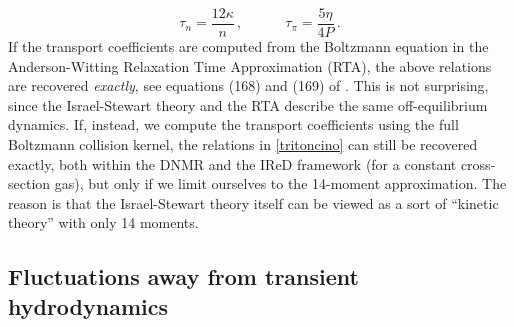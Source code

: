 \documentclass[aps,prd,preprint,nofootinbib,amsmath,amssymb,showpacs,longbibliography,singlecolumn,superscriptaddress,10pt]{revtex4-1}
\theoremstyle{plain}
\theoremstyle{definition}
\begin{document}
\begin{equation}\label{tritoncino}
    \tau_n = \dfrac{12 \kappa}{n} \, , \quad \quad \quad \tau_\pi = \dfrac{5\eta}{4P} \, .
\end{equation}
If the transport coefficients are computed from the Boltzmann equation in the Anderson-Witting Relaxation Time Approximation (RTA), the above relations are recovered \textit{exactly}, see equations (168) and (169) of \cite{Ambrus:2022vif}. This is not surprising, since the Israel-Stewart theory and the RTA describe the same off-equilibrium dynamics. If, instead, we compute the transport coefficients using the full Boltzmann collision kernel, the relations in \eqref{tritoncino} can still be recovered exactly, both within the DNMR \cite{Denicol:2012cn} and the IReD \cite{Wagner:2022ayd} framework (for a constant cross-section gas), but only if we limit ourselves to the 14-moment approximation. The reason is that the Israel-Stewart theory itself can be viewed as a sort of ``kinetic theory'' with only 14 moments. 



\subsection{Fluctuations away from transient hydrodynamics}
\label{subsec:fluct-trans-hydro}
\end{document}
